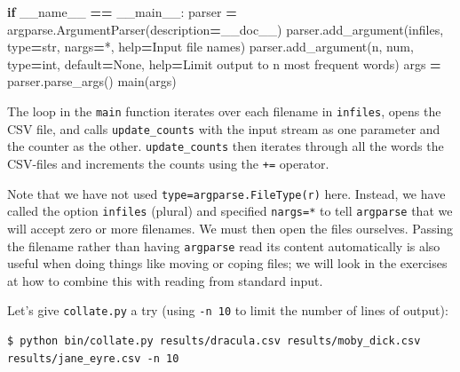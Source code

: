 \documentclass[
]{krantz}
\makeatletter
\newenvironment{Shaded}{\begin{snugshade}}{\end{snugshade}}
\newcommand{\BuiltInTok}[1]{#1}
\newcommand{\ControlFlowTok}[1]{\textcolor[rgb]{0.13,0.29,0.53}{\textbf{#1}}}
\newcommand{\NormalTok}[1]{#1}
\newcommand{\OperatorTok}[1]{\textcolor[rgb]{0.81,0.36,0.00}{\textbf{#1}}}
\newcommand{\StringTok}[1]{\textcolor[rgb]{0.31,0.60,0.02}{#1}}
\newcommand{\VariableTok}[1]{\textcolor[rgb]{0.00,0.00,0.00}{#1}}
\newenvironment{kframe}{%
\medskip{}
\setlength{\fboxsep}{.8em}
 \def\at@end@of@kframe{}%
 \ifinner\ifhmode%
  \def\at@end@of@kframe{\end{minipage}}%
  \begin{minipage}{\columnwidth}%
 \fi\fi%
 \def\FrameCommand##1{\hskip\@totalleftmargin \hskip-\fboxsep
 \colorbox{shadecolor}{##1}\hskip-\fboxsep
     \hskip-\linewidth \hskip-\@totalleftmargin \hskip\columnwidth}%
 \MakeFramed {\advance\hsize-\width
   \@totalleftmargin\z@ \linewidth\hsize
   \@setminipage}}%
 {\par\unskip\endMakeFramed%
 \at@end@of@kframe}
\renewenvironment{Shaded}{\begin{kframe}}{\end{kframe}}
\makeatother
\begin{document}
\begin{Shaded}
\begin{Highlighting}[]
\ControlFlowTok{if} \VariableTok{\_\_name\_\_} \OperatorTok{==} \StringTok{\textquotesingle{}\_\_main\_\_\textquotesingle{}}\NormalTok{:}
\NormalTok{    parser }\OperatorTok{=}\NormalTok{ argparse.ArgumentParser(description}\OperatorTok{=}\NormalTok{\_\_doc\_\_)}
\NormalTok{    parser.add\_argument(}\StringTok{\textquotesingle{}infiles\textquotesingle{}}\NormalTok{, }\BuiltInTok{type}\OperatorTok{=}\BuiltInTok{str}\NormalTok{, nargs}\OperatorTok{=}\StringTok{\textquotesingle{}*\textquotesingle{}}\NormalTok{, }\BuiltInTok{help}\OperatorTok{=}\StringTok{\textquotesingle{}Input file names\textquotesingle{}}\NormalTok{)}
\NormalTok{    parser.add\_argument(}\StringTok{\textquotesingle{}{-}n\textquotesingle{}}\NormalTok{, }\StringTok{\textquotesingle{}{-}{-}num\textquotesingle{}}\NormalTok{, }\BuiltInTok{type}\OperatorTok{=}\BuiltInTok{int}\NormalTok{, default}\OperatorTok{=}\VariableTok{None}\NormalTok{,}
                        \BuiltInTok{help}\OperatorTok{=}\StringTok{\textquotesingle{}Limit output to n most frequent words\textquotesingle{}}\NormalTok{)}
\NormalTok{    args }\OperatorTok{=}\NormalTok{ parser.parse\_args()}
\NormalTok{    main(args)}
\end{Highlighting}
\end{Shaded}

The loop in the \texttt{main} function iterates over each filename in \texttt{infiles},
opens the CSV file,
and calls \texttt{update\_counts} with the input stream as one parameter
and the counter as the other.
\texttt{update\_counts} then iterates through all the words the CSV-files
and increments the counts using the \texttt{+=} operator.

Note that we have not used \texttt{type=argparse.FileType(\textquotesingle{}r\textquotesingle{})} here.
Instead,
we have called the option \texttt{infiles} (plural)
and specified \texttt{nargs=\textquotesingle{}*\textquotesingle{}}
to tell \texttt{argparse} that we will accept zero or more filenames.
We must then open the files ourselves.
Passing the filename rather than having \texttt{argparse} read its content automatically
is also useful when doing things like moving or coping files;
we will look in the exercises at how to combine this with reading from standard input.

Let's give \texttt{collate.py} a try
(using \texttt{-n\ 10} to limit the number of lines of output):

\begin{verbatim}
$ python bin/collate.py results/dracula.csv results/moby_dick.csv results/jane_eyre.csv -n 10
\end{verbatim}
\end{document}
